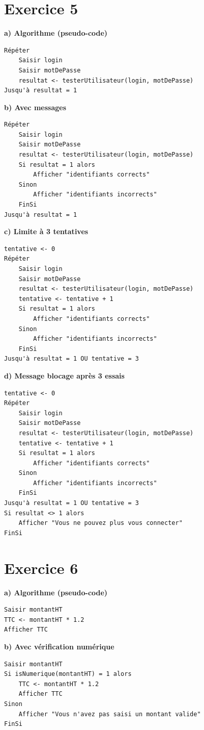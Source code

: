 \documentclass[12pt,a4paper]{article}
\begin{document}
\section*{Exercice 5}
\textbf{a) Algorithme (pseudo-code)}
\begin{verbatim}
Répéter
    Saisir login
    Saisir motDePasse
    resultat <- testerUtilisateur(login, motDePasse)
Jusqu'à resultat = 1
\end{verbatim}

\textbf{b) Avec messages}
\begin{verbatim}
Répéter
    Saisir login
    Saisir motDePasse
    resultat <- testerUtilisateur(login, motDePasse)
    Si resultat = 1 alors
        Afficher "identifiants corrects"
    Sinon
        Afficher "identifiants incorrects"
    FinSi
Jusqu'à resultat = 1
\end{verbatim}

\textbf{c) Limite à 3 tentatives}
\begin{verbatim}
tentative <- 0
Répéter
    Saisir login
    Saisir motDePasse
    resultat <- testerUtilisateur(login, motDePasse)
    tentative <- tentative + 1
    Si resultat = 1 alors
        Afficher "identifiants corrects"
    Sinon
        Afficher "identifiants incorrects"
    FinSi
Jusqu'à resultat = 1 OU tentative = 3
\end{verbatim}

\textbf{d) Message blocage après 3 essais}
\begin{verbatim}
tentative <- 0
Répéter
    Saisir login
    Saisir motDePasse
    resultat <- testerUtilisateur(login, motDePasse)
    tentative <- tentative + 1
    Si resultat = 1 alors
        Afficher "identifiants corrects"
    Sinon
        Afficher "identifiants incorrects"
    FinSi
Jusqu'à resultat = 1 OU tentative = 3
Si resultat <> 1 alors
    Afficher "Vous ne pouvez plus vous connecter"
FinSi
\end{verbatim}

\section*{Exercice 6}
\textbf{a) Algorithme (pseudo-code)}
\begin{verbatim}
Saisir montantHT
TTC <- montantHT * 1.2
Afficher TTC
\end{verbatim}

\textbf{b) Avec vérification numérique}
\begin{verbatim}
Saisir montantHT
Si isNumerique(montantHT) = 1 alors
    TTC <- montantHT * 1.2
    Afficher TTC
Sinon
    Afficher "Vous n'avez pas saisi un montant valide"
FinSi
\end{verbatim}
\end{document}
